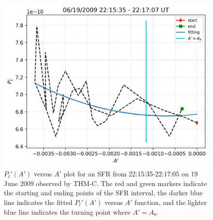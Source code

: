 \begin{figure}
    \centering
    \includegraphics[width=\textwidth]{Figures/Reconstructions/PtvsA_Ab_20090619_20090621.png}
    \caption[Double folding pattern of $P_t'$ versus $A'$ for 22:15:35-22:17:05 UT on 19 June 2009]{$P_t'(A')$ versus $A'$ plot for an SFR from 22:15:35-22:17:05 on 19 June 2009 observed by THM-C. The red and green markers indicate the starting and ending points of the SFR interval, the darker blue line indicates the fitted $P_t'(A')$ versus $A'$ function, and the lighter blue line indicates the turning point where $A'=A_b$.}
    \label{fig:Pt-vs-A-Ab}
\end{figure}

